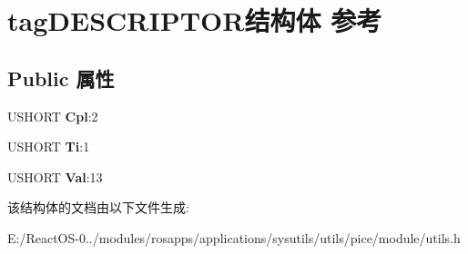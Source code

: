\hypertarget{structtag_d_e_s_c_r_i_p_t_o_r}{}\section{tag\+D\+E\+S\+C\+R\+I\+P\+T\+O\+R结构体 参考}
\label{structtag_d_e_s_c_r_i_p_t_o_r}
\subsection*{Public 属性}
\begin{DoxyCompactItemize}
\item 
\mbox{\label{structtag_d_e_s_c_r_i_p_t_o_r_ac6fee37cc38842e3cd99981179d04168}} 
U\+S\+H\+O\+RT {\bfseries Cpl}\+:2
\item 
\mbox{\label{structtag_d_e_s_c_r_i_p_t_o_r_a93c55061514aaf4de700c9ec9695d1bc}} 
U\+S\+H\+O\+RT {\bfseries Ti}\+:1
\item 
\mbox{\label{structtag_d_e_s_c_r_i_p_t_o_r_a34ded62c82a06c77595634af30ec3fea}} 
U\+S\+H\+O\+RT {\bfseries Val}\+:13
\end{DoxyCompactItemize}


该结构体的文档由以下文件生成\+:\begin{DoxyCompactItemize}
\item 
E\+:/\+React\+O\+S-\/0../modules/rosapps/applications/sysutils/utils/pice/module/utils.\+h\end{DoxyCompactItemize}
